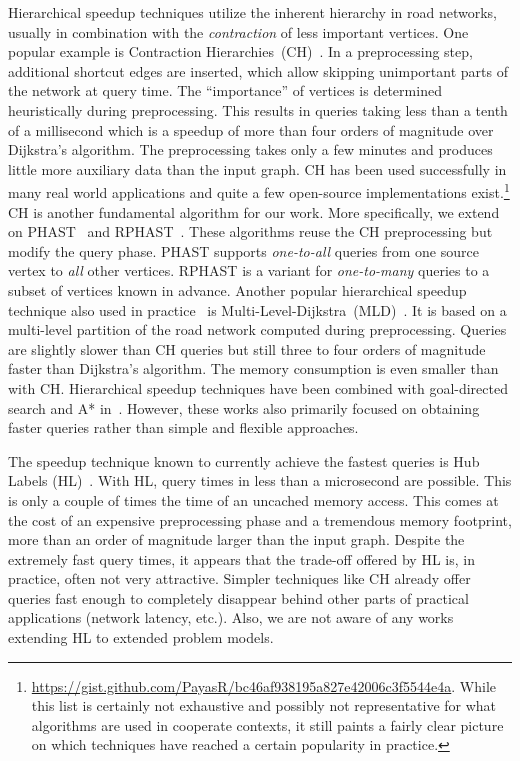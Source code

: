 \documentclass[manuscript,review]{acmart}
\begin{document}
Hierarchical speedup techniques utilize the inherent hierarchy in road networks, usually in combination with the \emph{contraction} of less important vertices.
One popular example is Contraction Hierarchies~(CH)~\cite{gssv-erlrn-12}.
In a preprocessing step, additional shortcut edges are inserted, which allow skipping unimportant parts of the network at query time.
The ``importance'' of vertices is determined heuristically during preprocessing.
This results in queries taking less than a tenth of a millisecond which is a speedup of more than four orders of magnitude over Dijkstra's algorithm.
The preprocessing takes only a few minutes and produces little more auxiliary data than the input graph.
CH has been used successfully in many real world applications and quite a few open-source implementations exist.\footnote{
\url{https://gist.github.com/PayasR/bc46af938195a827e42006c3f5544e4a}.
While this list is certainly not exhaustive and possibly not representative for what algorithms are used in cooperate contexts, it still paints a fairly clear picture on which techniques have reached a certain popularity in practice.
}
CH is another fundamental algorithm for our work.
More specifically, we extend on PHAST~\cite{dgnw-phast-13} and RPHAST~\cite{delling_et_al:OASIcs:2011:3266}.
These algorithms reuse the CH preprocessing but modify the query phase.
PHAST supports \emph{one-to-all} queries from one source vertex to \emph{all} other vertices.
RPHAST is a variant for \emph{one-to-many} queries to a subset of vertices known in advance.
%
Another popular hierarchical speedup technique also used in practice~\cite{bingblog} is Multi-Level-Dijkstra~(MLD)~\cite{swz-umlgt-02}.
It is based on a multi-level partition of the road network computed during preprocessing.
Queries are slightly slower than CH queries but still three to four orders of magnitude faster than Dijkstra's algorithm.
The memory consumption is even smaller than with CH.
Hierarchical speedup techniques have been combined with goal-directed search and A* in~\cite{bdsssw-chgds-10,gkw-blwr-07,bdgwz-sfpcs-19}.
However, these works also primarily focused on obtaining faster queries rather than simple and flexible approaches.

The speedup technique known to currently achieve the fastest queries is Hub Labels (HL)~\cite{DBLP:conf/esa/AbrahamDGW12,DBLP:conf/wea/DellingGW13}.
With HL, query times in less than a microsecond are possible.
This is only a couple of times the time of an uncached memory access.
This comes at the cost of an expensive preprocessing phase and a tremendous memory footprint, more than an order of magnitude larger than the input graph.
Despite the extremely fast query times, it appears that the trade-off offered by HL is, in practice, often not very attractive.
Simpler techniques like CH already offer queries fast enough to completely disappear behind other parts of practical applications (network latency, etc.).
Also, we are not aware of any works extending HL to extended problem models.
\end{document}
